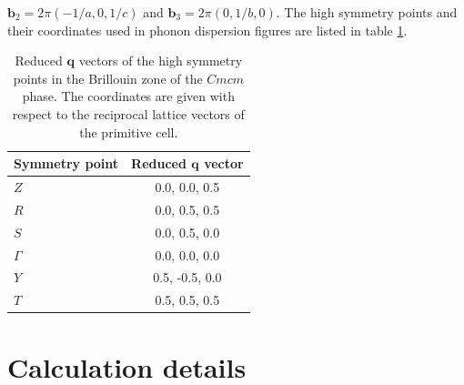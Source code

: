 $\mathbf{b}_{2}=2\pi(-1/a,0,1/c)$ and $\mathbf{b}_{3}=2\pi(0,1/b,0)$. The high symmetry points and their coordinates 
used in phonon dispersion figures are listed in table \ref{qpoints}.
\begin{table}
\begin{center}
\begin{tabular*}{0.45\textwidth}{l c}
 \hline
 \hline
             Symmetry point  & Reduced $\mathbf{q}$ vector  \\
 \hline
 $Z$                  &  0.0, 0.0, 0.5  \\
 $R$                  &  0.0, 0.5, 0.5  \\
 $S$                  &  0.0, 0.5, 0.0  \\
 $\Gamma$             &  0.0, 0.0, 0.0  \\
 $Y$                  &  0.5, -0.5, 0.0  \\
 $T$                  &  0.5, 0.5, 0.5  \\
 \hline
 \hline
\end{tabular*}
\end{center}
\caption[Reduced $\mathbf{q}$ vectors of the high symmetry points in the Brillouin zone of the $Cmcm$ phase.]{Reduced 
$\mathbf{q}$ vectors of the high symmetry points in the Brillouin zone of the $Cmcm$ phase. The coordinates are given 
with respect to the reciprocal lattice vectors of the primitive cell.}
\label{qpoints}
\end{table}

\section{Calculation details}

